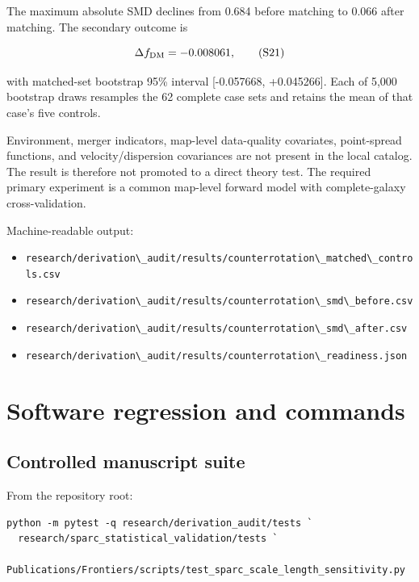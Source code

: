 \documentclass[utf8]{frontiers_suppmat}
\providecommand{\tightlist}{}
\newcommand{\passthrough}[1]{#1}
\begin{document}
The maximum absolute SMD declines from 0.684 before matching to 0.066 after matching. The secondary outcome is

\[
\Delta f_{\rm DM}=-0.008061,
\tag{S21}
\]

with matched-set bootstrap 95\% interval {[}-0.057668, +0.045266{]}. Each of 5,000 bootstrap draws resamples the 62 complete case sets and retains the mean of that case's five controls.

Environment, merger indicators, map-level data-quality covariates, point-spread functions, and velocity/dispersion covariances are not present in the local catalog. The result is therefore not promoted to a direct theory test. The required primary experiment is a common map-level forward model with complete-galaxy cross-validation.

Machine-readable output:

\begin{itemize}
\tightlist
\item
  \passthrough{\lstinline!research/derivation\_audit/results/counterrotation\_matched\_controls.csv!}
\item
  \passthrough{\lstinline!research/derivation\_audit/results/counterrotation\_smd\_before.csv!}
\item
  \passthrough{\lstinline!research/derivation\_audit/results/counterrotation\_smd\_after.csv!}
\item
  \passthrough{\lstinline!research/derivation\_audit/results/counterrotation\_readiness.json!}
\end{itemize}

\section{Software regression and commands}\label{s8.-software-regression-and-commands}

\subsection{Controlled manuscript suite}\label{s8.1-controlled-manuscript-suite}

From the repository root:

\begin{lstlisting}
python -m pytest -q research/derivation_audit/tests `
  research/sparc_statistical_validation/tests `
  Publications/Frontiers/scripts/test_sparc_scale_length_sensitivity.py
\end{lstlisting}
\end{document}
